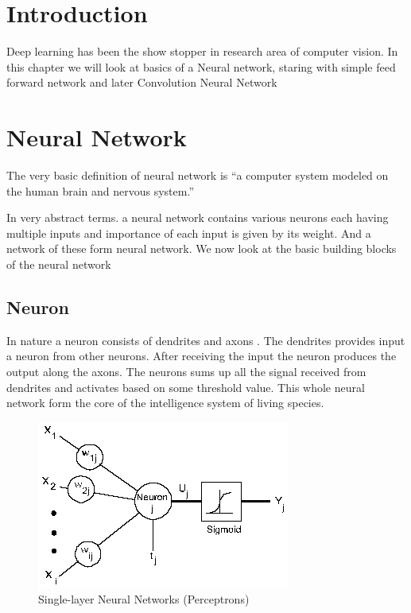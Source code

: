 
\section{Introduction}
Deep learning has been the show stopper in research area of computer vision. In this chapter we will look at basics of a Neural network, staring with simple feed forward network and later Convolution Neural Network


\section{Neural Network}

The very basic definition of neural network is “a computer system modeled on the human brain and nervous system.”
\par
In very abstract terms. a neural network contains various neurons each having multiple inputs and importance of each input is given by its weight. And a network of these form neural network. We now look at the basic building blocks of the neural network

\subsection{Neuron}
In nature a neuron consists of dendrites and  axons . The dendrites provides input a neuron from other neurons. After receiving the input the neuron produces the output along the axons. The neurons sums up all the signal received from dendrites and activates based on some threshold value.  This whole neural network form the core of the intelligence system of living species. 


\begin{figure}[H]
  \centering
    \includegraphics[scale=.3, angle=0]{Files/nn2.png}
    \caption[Single-layer Neural Networks (Perceptrons)]{Single-layer Neural Networks (Perceptrons)}
    \label{fig:NNNN}
\end{figure}

